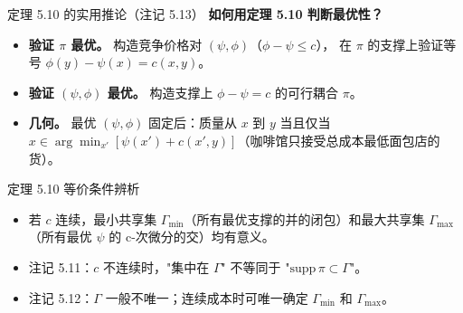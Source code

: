 \begin{frame}{定理 5.10 的实用推论（注记 5.13）}
  \textbf{如何用定理 5.10 判断最优性？}

  \begin{itemize}
    \item \textbf{验证 $\pi$ 最优。} 构造竞争价格对 $(\psi,\phi)$（$\phi-\psi\le c$），
      在 $\pi$ 的支撑上验证等号 $\phi(y)-\psi(x)=c(x,y)$。
    \item \textbf{验证 $(\psi,\phi)$ 最优。} 构造支撑上 $\phi-\psi=c$ 的可行耦合 $\pi$。
    \item \textbf{几何。} 最优 $(\psi,\phi)$ 固定后：质量从 $x$ 到 $y$ 当且仅当
      $x\in\arg\min_{x'}[\psi(x')+c(x',y)]$（咖啡馆只接受总成本最低面包店的货）。
  \end{itemize}

\end{frame}

\begin{frame}{定理 5.10 等价条件辨析}

  \begin{itemize}
    \item 若 $c$ 连续，最小共享集 $\Gamma_{\min}$（所有最优支撑的并的闭包）和最大共享集
      $\Gamma_{\max}$（所有最优 $\psi$ 的 c-次微分的交）均有意义。
    \item 注记 5.11：$c$ 不连续时，"集中在 $\Gamma$" 不等同于 "$\mathrm{supp}\,\pi\subset\Gamma$"。
    \item 注记 5.12：$\Gamma$ 一般不唯一；连续成本时可唯一确定 $\Gamma_{\min}$ 和 $\Gamma_{\max}$。
  \end{itemize}

\end{frame}

